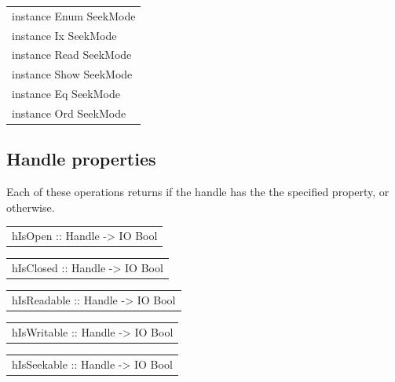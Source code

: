 \begin{haddockdesc}
\item[\begin{tabular}{@{}l}
instance Enum SeekMode\\instance Ix SeekMode\\instance Read SeekMode\\instance Show SeekMode\\instance Eq SeekMode\\instance Ord SeekMode
\end{tabular}]
\end{haddockdesc}
\subsection{Handle properties}
Each of these operations returns  if the handle has the the
 specified property, or  otherwise.\par
\begin{haddockdesc}
\item[\begin{tabular}{@{}l}
hIsOpen :: Handle -> IO Bool
\end{tabular}]
\item[\begin{tabular}{@{}l}
hIsClosed :: Handle -> IO Bool
\end{tabular}]
\item[\begin{tabular}{@{}l}
hIsReadable :: Handle -> IO Bool
\end{tabular}]
\item[\begin{tabular}{@{}l}
hIsWritable :: Handle -> IO Bool
\end{tabular}]
\item[\begin{tabular}{@{}l}
hIsSeekable :: Handle -> IO Bool
\end{tabular}]
\end{haddockdesc}
